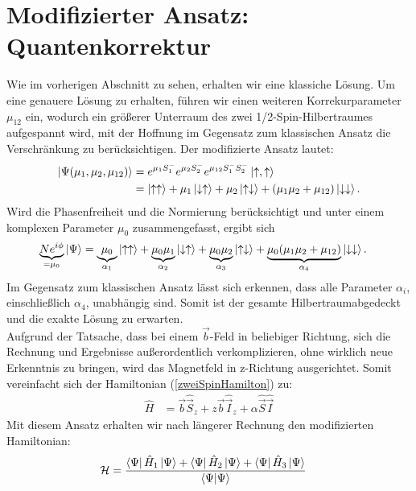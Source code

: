 



\section{Modifizierter Ansatz: Quantenkorrektur}
\noindent Wie im vorherigen Abschnitt zu sehen, erhalten wir eine klassiche Lösung. Um eine genauere Lösung zu erhalten, 
führen wir einen weiteren Korrekurparameter $\mu_{12}$ ein, wodurch ein größerer Unterraum des zwei 1/2-Spin-Hilbertraumes aufgespannt 
wird, mit der Hoffnung im Gegensatz zum klassischen Ansatz die Verschränkung zu berücksichtigen. Der modifizierte Ansatz lautet:
\begin{align}
    \ket{\Psi(\mu_1,\mu_2,\mu_{12})} &= e^{\mu_1 S_1^-}e^{\mu_2 S_2^-}e^{\mu_{12} S_1^-S_2^-}\ket{\uparrow,\uparrow}\\
                                    &= \ket{\uparrow \uparrow} +\mu_1\ket{\downarrow \uparrow} + \mu_2\ket{\uparrow \downarrow} + (\mu_1\mu_2 + \mu_{12})\ket{\downarrow \downarrow}.
\end{align}
Wird  die Phasenfreiheit und die Normierung berücksichtigt und unter einem komplexen Parameter $\mu_0$ zusammengefasst, ergibt sich
\begin{align}
    \underbrace{Ne^{i\phi}}_{=\mu_0}\ket{\Psi} &= \underbrace{\mu_0}_{\alpha_1}\ket{\uparrow \uparrow} 
    + \underbrace{\mu_0\mu_1}_{\alpha_2}\ket{\downarrow \uparrow} + \underbrace{\mu_0\mu_2}_{\alpha_3}\ket{\uparrow \downarrow} 
    + \underbrace{\mu_0(\mu_1\mu_2 + \mu_{12})}_{\alpha_4}\ket{\downarrow\downarrow}.
\end{align}
Im Gegensatz zum klassischen Ansatz lässt sich erkennen, dass alle Parameter $\alpha_i$, einschließlich $\alpha_4$, unabhängig sind. Somit ist der gesamte
Hilbertraumabgedeckt und die exakte Lösung zu erwarten.\\
Aufgrund der Tatsache, dass bei einem $\vec{b}$-Feld in beliebiger Richtung, sich die Rechnung und Ergebnisse außerordentlich verkomplizieren, ohne 
wirklich neue Erkenntnis zu bringen, wird das Magnetfeld in z-Richtung ausgerichtet. Somit vereinfacht sich der 
Hamiltonian (\ref{zweiSpinHamilton}) zu:
\begin{align}\label{Hamiltonian_Bz}
    \hat{H} &= \vec{b}\hat{\vec{S}}_z +  z\vec{b}\hat{\vec{I}}_z + \alpha \hat{\vec{S}}\hat{\vec{I}}
\end{align}
Mit diesem Ansatz erhalten wir nach längerer Rechnung den modifizierten Hamiltonian:
\begin{align}
    \mathcal{H} &= \frac{\bra{\Psi}\hat{H}_1\ket{\Psi} +\bra{\Psi}\hat{H}_2\ket{\Psi} + \bra{\Psi}\hat{H}_3\ket{\Psi}}{\bra{\Psi}\ket{\Psi}}
\end{align}
